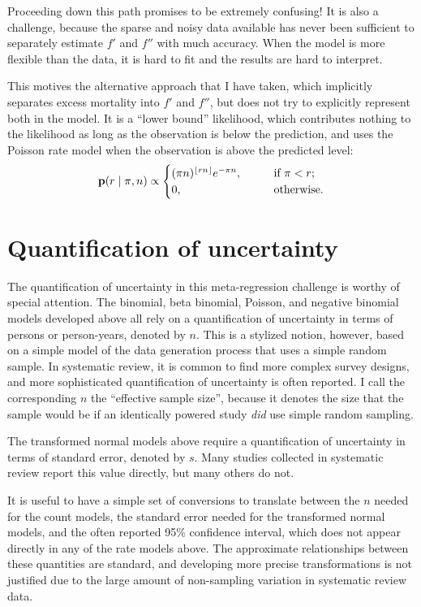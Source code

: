 Proceeding down this path promises to be extremely confusing!  It is
also a challenge, because the sparse and noisy data available has
never been sufficient to separately estimate $f'$ and $f''$ with much
accuracy.  When the model is more flexible than the data, it is hard
to fit and the results are hard to interpret.

This motives the alternative approach that I have taken, which
implicitly separates excess mortality into $f'$ and $f''$, but does
not try to explicitly represent both in the model.  It is a ``lower
bound'' likelihood, which contributes nothing to the likelihood as
long as the observation is below the prediction, and uses the Poisson
rate model when the observation is above the predicted level:
\[
\mathbf{p}(r \;|\; \pi,n) \propto
\begin{cases}
(\pi n)^{\lfloor rn\rfloor} e^{-\pi n}, &\qquad\text{if } \pi < r;\\
  0, &\qquad\text{otherwise.}
\end{cases} 
\]

\section{Quantification of uncertainty}
The quantification of uncertainty in this meta-regression challenge is
worthy of special attention.  The binomial, beta binomial, Poisson,
and negative binomial models developed above all rely on a
quantification of uncertainty in terms of persons or person-years,
denoted by $n$.  This is a stylized notion, however, based on a simple
model of the data generation process that uses a simple random sample.
In systematic review, it is common to find more complex survey
designs, and more sophisticated quantification of uncertainty is often
reported.  I call the corresponding $n$ the ``effective sample size'',
because it denotes the size that the sample would be if an identically
powered study \emph{did} use simple random sampling.

The transformed normal models above require a quantification of
uncertainty in terms of standard error, denoted by $s$.  Many studies
collected in systematic review report this value directly, but many
others do not.

It is useful to have a simple set of conversions to translate between
the $n$ needed for the count models, the standard error needed for the
transformed normal models, and the often reported 95\% confidence
interval, which does not appear directly in any of the rate models
above. The approximate relationships between these quantities are
standard, and developing more precise transformations is not justified
due to the large amount of non-sampling variation in systematic review
data.


